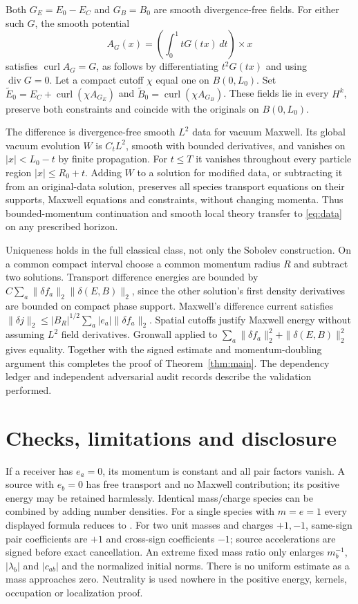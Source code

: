 \documentclass[11pt]{article}
\newcommand{\diver}{\operatorname{div}}
\newcommand{\curl}{\operatorname{curl}}
\theoremstyle{remark}\newtheorem{remark}[theorem]{Remark}
\numberwithin{equation}{section}
\begin{document}
Both $G_E=E_0-E_C$ and $G_B=B_0$ are smooth divergence-free fields.
For either such $G$, the smooth potential
\[
 A_G(x)=\left(\int_0^1 tG(tx)\,dt\right)\times x
\]
satisfies $\curl A_G=G$, as follows by differentiating $t^2G(tx)$ and
using $\diver G=0$. Let a compact cutoff $\chi$ equal one on $B(0,L_0)$.
Set $\widetilde E_0=E_C+\curl(\chi A_{G_E})$ and
$\widetilde B_0=\curl(\chi A_{G_B})$.
These fields lie in every $H^k$, preserve both constraints and coincide
with the originals on $B(0,L_0)$.

The difference is divergence-free smooth $L^2$ data for vacuum Maxwell.
Its global vacuum evolution $W$ is $C_tL^2$, smooth with bounded derivatives,
and vanishes on $|x|<L_0-t$ by finite propagation. For $t\le T$ it
vanishes throughout every particle region $|x|\le R_0+t$.
Adding $W$ to a solution for modified data, or subtracting it from an
original-data solution, preserves all species transport equations on
their supports, Maxwell equations and constraints, without changing
momenta. Thus bounded-momentum continuation and smooth local theory
transfer to \eqref{eq:data} on any prescribed horizon.

Uniqueness holds in the full classical class, not only the Sobolev construction.
On a common compact interval choose a common momentum radius $R$ and
subtract two solutions. Transport difference energies are bounded by
$C\sum_a\|\delta f_a\|_2\|\delta(E,B)\|_2$, since the other solution's
first density derivatives are bounded on compact phase support. Maxwell's
difference current satisfies
$\|\delta j\|_2\le|B_R|^{1/2}\sum_a|e_a|\|\delta f_a\|_2$.
Spatial cutoffs justify Maxwell energy without assuming $L^2$ field
derivatives. Gronwall applied to
$\sum_a\|\delta f_a\|_2^2+\|\delta(E,B)\|_2^2$ gives equality.
Together with the signed estimate and momentum-doubling argument this
completes the proof of Theorem~\ref{thm:main}. The dependency ledger and
independent adversarial audit records describe the validation performed.

\section{Checks, limitations and disclosure}
If a receiver has $e_a=0$, its momentum is constant and all pair factors
vanish. A source with $e_b=0$ has free transport and no Maxwell contribution;
its positive energy may be retained harmlessly. Identical mass/charge species
can be combined by adding number densities. For a single species with
$m=e=1$ every displayed formula reduces to \cite{OAI362}.
For two unit masses and charges $+1,-1$, same-sign pair coefficients are
$+1$ and cross-sign coefficients $-1$; source accelerations are signed
before exact cancellation. An extreme fixed mass ratio only enlarges
$m_b^{-1}$, $|\lambda_b|$ and $|c_{ab}|$ and the normalized initial norms.
There is no uniform estimate as a mass approaches zero. Neutrality is used
nowhere in the positive energy, kernels, occupation or localization proof.
\end{document}
